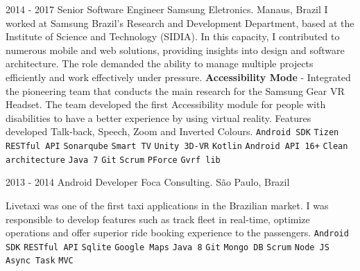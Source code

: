 \documentclass[9pt]{developercv} %
\begin{document}
\begin{entrylist}
	\entry
		{2014 -  2017}
		{Senior Software Engineer}
		{Samsung Eletronics. Manaus, Brazil}
{
I worked at Samsung Brazil's Research and Development Department, based at the Institute of Science and Technology (SIDIA). In this capacity, I contributed to numerous mobile and web solutions, providing insights into design and software architecture. The role demanded the ability to manage multiple projects efficiently and work effectively under pressure.
\newline
\newline
\textbf{Accessibility Mode } - Integrated the pioneering team that conducts the main research for the Samsung Gear VR Headset. The team developed the first  Accessibility module for people with disabilities to have a better experience by using virtual reality. Features developed Talk-back, Speech, Zoom and Inverted Colours.
 	{
 		\texttt{Android SDK}\slashsep
 		\texttt{Tizen}\slashsep
		 \texttt{RESTful API}\slashsep
		 \texttt{Sonarqube}\slashsep
		 \texttt{Smart TV}\slashsep
		 \texttt{Unity 3D-VR}\slashsep
		 \texttt{Kotlin}\slashsep
		 \texttt{Android API 16+}\slashsep
		 \texttt{Clean architecture}\slashsep
		 \texttt{Java 7}\slashsep
		 \texttt{Git}\slashsep
		 \texttt{Scrum}\slashsep
		 \texttt{PForce}\slashsep
		 \texttt{Gvrf lib}\slashsep
	}
}
\end{entrylist}
\begin{entrylist}
	\entry
		{2013 -  2014}
		{Android Developer}
		{Foca Consulting. São Paulo, Brazil}
{

Livetaxi was one of the first taxi applications in the Brazilian market. I was responsible to develop features such as track fleet in real-time, optimize operations and offer superior ride booking experience to the passengers.
\newline
 	{
 		\texttt{Android SDK}\slashsep
		 \texttt{RESTful API}\slashsep
		 \texttt{Sqlite}\slashsep
		 \texttt{Google Maps}\slashsep
		 \texttt{Java 8}\slashsep
		 \texttt{Git}\slashsep
		 \texttt{Mongo DB}\slashsep
		 \texttt{Scrum}\slashsep
		 \texttt{Node JS}\slashsep
		 \texttt{Async Task}\slashsep
		 \texttt{MVC}\slashsep
	}
}
\end{entrylist}
\end{document}
